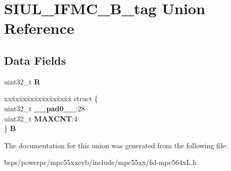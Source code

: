 \hypertarget{unionSIUL__IFMC__32B__tag}{}\section{S\+I\+U\+L\+\_\+\+I\+F\+M\+C\+\_\+B\+\_\+tag Union Reference}
\label{unionSIUL__IFMC__32B__tag}
\subsection*{Data Fields}
\begin{DoxyCompactItemize}
\item 
\mbox{\label{unionSIUL__IFMC__32B__tag_a86efa92b43a0f711e52ed89b9b018c88}} 
uint32\+\_\+t {\bfseries R}
\item 
\mbox{\label{unionSIUL__IFMC__32B__tag_a87b120e5c6fd19ccd7846a103fb14457}} 
\begin{tabbing}
xx\=xx\=xx\=xx\=xx\=xx\=xx\=xx\=xx\=\kill
struct \{\\
\>uint32\_t {\bfseries \_\_pad0\_\_}:28\\
\>uint32\_t {\bfseries MAXCNT}:4\\
\} {\bfseries B}\\

\end{tabbing}\end{DoxyCompactItemize}


The documentation for this union was generated from the following file\+:\begin{DoxyCompactItemize}
\item 
bsps/powerpc/mpc55xxevb/include/mpc55xx/fsl-\/mpc564x\+L.\+h\end{DoxyCompactItemize}

